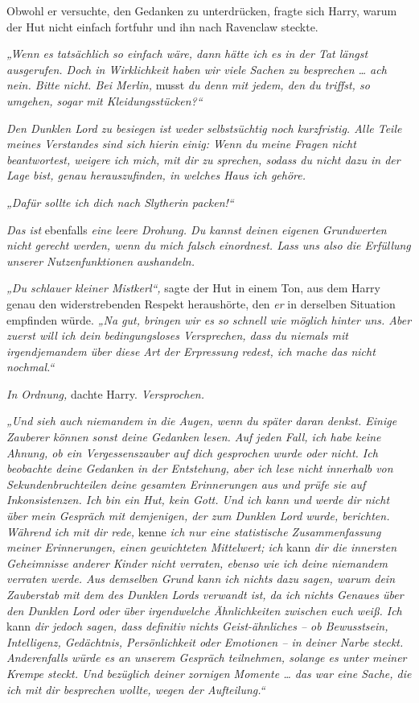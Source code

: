 Obwohl er versuchte, den Gedanken zu unterdrücken, fragte sich Harry, warum der Hut nicht einfach fortfuhr und ihn nach Ravenclaw steckte.

\emph{„Wenn es tatsächlich so einfach wäre, dann hätte ich es in der Tat längst ausgerufen. Doch in Wirklichkeit haben wir viele Sachen zu besprechen … ach nein. Bitte nicht. Bei Merlin,} musst \emph{du denn mit jedem, den du triffst, so umgehen, sogar mit Kleidungsstücken?“}

\emph{Den Dunklen Lord zu besiegen ist weder selbstsüchtig noch kurzfristig. Alle Teile meines Verstandes sind sich hierin einig: Wenn du meine Fragen nicht beantwortest, weigere ich mich, mit dir zu sprechen, sodass du nicht dazu in der Lage bist, genau herauszufinden, in welches Haus ich gehöre. }

\emph{„Dafür sollte ich dich nach Slytherin packen!“}

\emph{Das ist} ebenfalls \emph{eine leere Drohung. Du kannst deinen eigenen Grundwerten nicht gerecht werden, wenn du mich falsch einordnest. Lass uns also die Erfüllung unserer Nutzenfunktionen aushandeln.}

\emph{„Du schlauer kleiner Mistkerl“,} sagte der Hut in einem Ton, aus dem Harry genau den widerstrebenden Respekt heraushörte, den \emph{er} in derselben Situation empfinden würde. \emph{„Na gut, bringen wir es so schnell wie möglich hinter uns. Aber zuerst will ich dein bedingungsloses Versprechen, dass du niemals mit irgendjemandem über diese Art der Erpressung redest, ich mache das nicht nochmal.“}

\emph{In Ordnung,} dachte Harry. \emph{Versprochen.}

\emph{„Und sieh auch niemandem in die Augen, wenn du später daran denkst. Einige Zauberer können sonst deine Gedanken lesen. Auf jeden Fall, ich habe keine Ahnung, ob ein Vergessenszauber auf dich gesprochen wurde oder nicht. Ich beobachte deine Gedanken in der Entstehung, aber ich lese nicht innerhalb von Sekundenbruchteilen deine gesamten Erinnerungen aus und prüfe sie auf Inkonsistenzen. Ich bin ein Hut, kein Gott. Und ich kann und werde dir nicht über mein Gespräch mit demjenigen, der zum Dunklen Lord wurde, berichten. Während ich mit dir rede,} kenne\emph{ ich nur eine statistische Zusammenfassung meiner Erinnerungen, einen gewichteten Mittelwert; ich }kann\emph{ dir die innersten Geheimnisse anderer Kinder nicht verraten, ebenso wie ich deine niemandem verraten werde. Aus demselben Grund kann ich nichts dazu sagen, warum dein Zauberstab mit dem des Dunklen Lords verwandt ist, da ich nichts Genaues über den Dunklen Lord oder über irgendwelche Ähnlichkeiten zwischen euch weiß. Ich }kann\emph{ dir jedoch sagen, dass definitiv nichts Geist-ähnliches – ob Bewusstsein, Intelligenz, Gedächtnis, Persönlichkeit oder Emotionen – in deiner Narbe steckt. Anderenfalls würde es an unserem Gespräch teilnehmen, solange es unter meiner Krempe steckt. Und bezüglich deiner zornigen Momente … das war eine Sache, die ich mit dir besprechen wollte, wegen der Aufteilung.“} 

